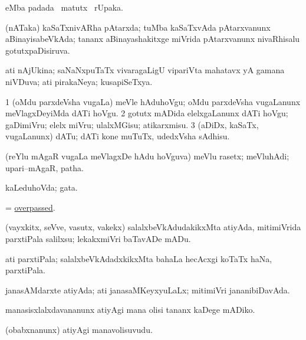 \bentry
{}
\gl{\kirx}
\bmng
{} eMba padada \BU\ matutx \BUkaq\ rUpaka. 
\emng
\eentry


\bentry
{}
\gl{\gu}
\bmng
(nATaka) kaSaTxnivARha pAtarxda; tuMba kaSaTxvAda pAtarxvanunx aBinayisabeVkAda; tananx aBinayashakitxge miVrida pAtarxvanunx nivaRhisalu gotutxpaDisiruva. 
\emng
\eentry


\bentry
{}
\gl{\gu}
\bmng
ati nAjUkina; saNaNxpuTaTx vivaragaLigU vipariVta mahatavx yA gamana niVDuva; ati pirakaNeya; kusapiSeTxya. 
\emng
\eentry


\bentry
{}
\gl{\sakirx}
\bmng
\bnum
\num{1} (oMdu parxdeVsha \mo vugaLa) meVle hAduhoVgu; oMdu parxdeVsha \mo vugaLanunx meVlagxDeyiMda dATi hoVgu. 
\num{2} gotutx mADida elelxgaLanunx dATi hoVgu; gaDimiVru; elelx miVru; ulalxMGisu; atikarxmisu. 
\num{3} (aDiDx, kaSaTx, \mo vugaLanunx) dATu; dATi kone muTuTx, udedxVsha sAdhisu. 
\enum
\emng
\eentry


\bentry
{}
\gl{\nA}
\bmng
(reYlu mAgaR \mo vugaLa meVlagxDe hAdu hoVguva) meVlu rasetx; meVluhAdi; upari--mAgaR, patha. 
\emng
\eentry


\bentry
{}
\gl{\gu}
\bmng
kaLeduhoVda; gata. 
\emng
\eentry


\bentry
{}
\gl{\gu}
\bmng
= \hyperlink{overpassed}{overpassed}. 
\emng
\eentry


\bentry
{}
\gl{\sakirx}
\bmng
(vayxkitx, seVve, vasutx, \mo vakekx) salalxbeVkAdudakikxMta atiyAda, mitimiVrida parxtiPala salilxsu; lekakxmiVri baTavADe mADu. 
\emng
\eentry


\bentry
{}
\gl{\nA}
\bmng
ati parxtiPala; salalxbeVkAdadxkikxMta bahaLa hecAcxgi koTaTx haNa, parxtiPala. 
\emng
\eentry


\bentry
{}
\gl{\gu}
\bmng
janasAMdarxte atiyAda; ati janasaMKeyxyuLaLx; mitimiVri jananibiDavAda. 
\emng
\eentry


\bentry
{}
\gl{\sakirx}
\bmng
manasisxlalxdavananunx atiyAgi mana olisi tananx kaDege mADiko. 
\emng
\eentry


\bentry
{}
\gl{\nA}
\bmng
(obabxnanunx) atiyAgi manavolisuvudu. 
\emng
\eentry


